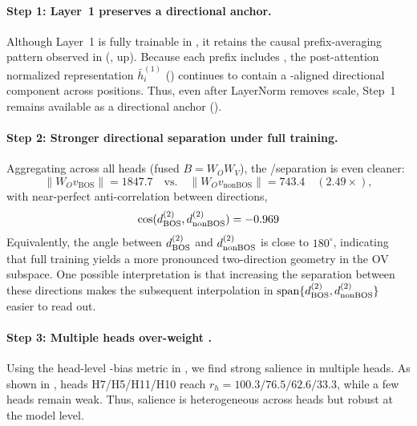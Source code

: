 \documentclass{article}
\theoremstyle{plain}
\theoremstyle{definition}
\theoremstyle{remark}
\begin{document}
\paragraph{Step 1: Layer~1 preserves a directional \bos anchor.}
Although Layer~1 is fully trainable in \modelfull, it retains the causal prefix-averaging pattern observed in \modelminimal (, up).
Because each prefix includes \bos, the post-attention normalized representation $\bar h_i^{(1)}$ () continues to contain a \bos-aligned directional component across positions.
Thus, even after LayerNorm removes scale, Step~1 remains available as a directional anchor ().

\paragraph{Step 2: Stronger directional separation under full training.}
Aggregating across all heads (fused $B=W_O W_V$), the \bos/\nbos separation is even cleaner:
\[
\|W_O v_{\text{BOS}}\|=1847.7
\quad\text{vs.}\quad
\|W_O v_{\text{nonBOS}}\|=743.4
\quad (2.49\times),
\]
with near-perfect anti-correlation between directions,
\[
\cos(d_{\text{BOS}}^{(2)}, d_{\text{nonBOS}}^{(2)})=-0.969
\]
Equivalently, the angle between $d_{\text{BOS}}^{(2)}$ and $d_{\text{nonBOS}}^{(2)}$ is close to $180^\circ$, indicating that full training yields a more pronounced two-direction geometry in the OV subspace.
One possible interpretation is that increasing the separation between these directions makes the subsequent interpolation in $\mathrm{span}\{d_{\text{BOS}}^{(2)}, d_{\text{nonBOS}}^{(2)}\}$ easier to read out.

\paragraph{Step 3: Multiple heads over-weight \bos.}
Using the head-level \bos-bias metric in , we find strong \bos salience in multiple heads.
As shown in , heads H7/H5/H11/H10 reach
$r_h=100.3/76.5/62.6/33.3$, while a few heads remain weak.
Thus, salience is heterogeneous across heads but robust at the model level.
\end{document}
